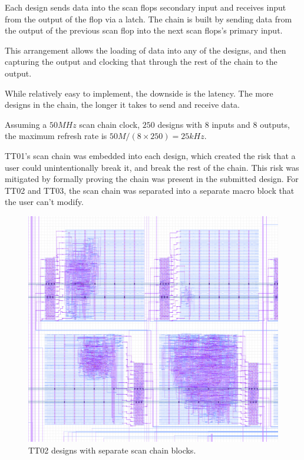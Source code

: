 Each design sends data into the scan flops secondary input and receives input from the output of the flop via a latch.
The chain is built\cite{updateiodesign} by sending data from the output of the previous scan flop into the next scan flops’s primary input.

This arrangement allows the loading of data into any of the designs, and then capturing the output and clocking that through the rest of the chain to the output.

While relatively easy to implement, the downside is the latency.
The more designs in the chain, the longer it takes to send and receive data.

Assuming a \(50 MHz\) scan chain clock, \(250\) designs with \(8\) inputs and \(8\) outputs, the maximum refresh rate is \(50M / (8 \times 250) = 25kHz\).

TT01’s scan chain was embedded into each design, which created the risk that a user could unintentionally break it, and break the rest of the chain.
This risk was mitigated by formally\cite{tinytapeoutscan} proving the chain was present in the submitted design.
For TT02 and TT03, the scan chain was separated into a separate macro block that the user can’t modify.

\begin{figure}[htp]
\centering
\includegraphics[width=\columnwidth]{./Figs/tt02_gds_zoom.png}
\caption{TT02 designs with separate scan chain blocks.}
\label{fig:TT02_separate_scan_blocks}
\end{figure}


